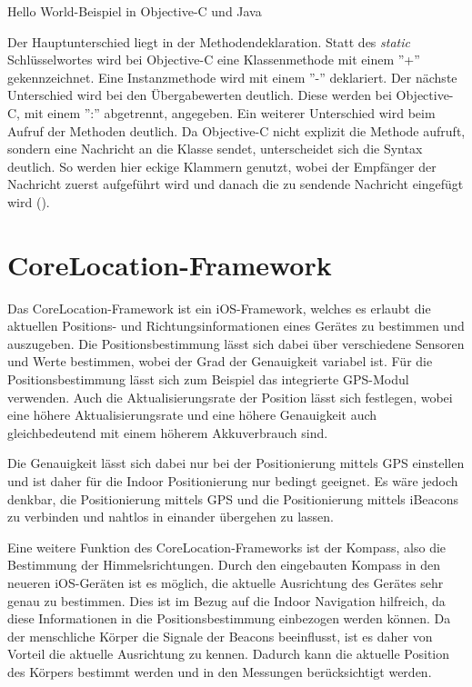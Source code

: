 \begin{listing}[htb!]
    \caption{Hello World-Beispiel in Objective-C und Java}
	\label{lst:helloworld_objc}
\end{listing}

Der Hauptunterschied liegt in der Methodendeklaration. Statt des \emph{static} Schlüsselwortes wird bei Objective-C eine Klassenmethode mit einem ''+'' gekennzeichnet. Eine Instanzmethode wird mit einem ''-'' deklariert. Der nächste Unterschied wird bei den Übergabewerten deutlich. Diese werden bei Objective-C, mit einem '':'' abgetrennt, angegeben.
Ein weiterer Unterschied wird beim Aufruf der Methoden deutlich. Da Objective-C nicht explizit die Methode aufruft, sondern eine Nachricht an die Klasse sendet, unterscheidet sich die Syntax deutlich. So werden hier eckige Klammern genutzt, wobei der Empfänger der Nachricht zuerst aufgeführt wird und danach die zu sendende Nachricht eingefügt wird (\citet{objc}).


\section{CoreLocation-Framework}
\label{sec:technologies:corelocation}
Das CoreLocation-Framework ist ein iOS-Framework, welches es erlaubt die aktuellen Positions- und Richtungsinformationen eines Gerätes zu bestimmen und auszugeben.
Die Positionsbestimmung lässt sich dabei über verschiedene Sensoren und Werte bestimmen, wobei der Grad der Genauigkeit variabel ist.
Für die Positionsbestimmung lässt sich zum Beispiel das integrierte GPS-Modul verwenden.
Auch die Aktualisierungsrate der Position lässt sich festlegen, wobei eine höhere Aktualisierungsrate und eine höhere Genauigkeit auch gleichbedeutend mit einem höherem Akkuverbrauch sind.
	
Die Genauigkeit lässt sich dabei nur bei der Positionierung mittels GPS einstellen und ist daher für die Indoor Positionierung nur bedingt geeignet. Es wäre jedoch denkbar, die Positionierung mittels GPS und die Positionierung mittels iBeacons zu verbinden und nahtlos in einander übergehen zu lassen.

Eine weitere Funktion des CoreLocation-Frameworks ist der Kompass, also die Bestimmung der Himmelsrichtungen. Durch den eingebauten Kompass in den neueren iOS-Geräten ist es möglich, die aktuelle Ausrichtung des Gerätes sehr genau zu bestimmen. Dies ist im Bezug auf die Indoor Navigation hilfreich, da diese Informationen in die Positionsbestimmung einbezogen werden können. Da der menschliche Körper die Signale der Beacons beeinflusst, ist es daher von Vorteil die aktuelle Ausrichtung zu kennen. Dadurch kann die aktuelle Position des Körpers bestimmt werden und in den Messungen berücksichtigt werden.

